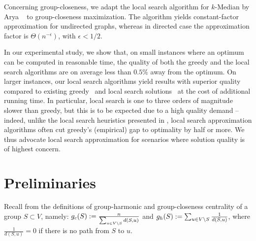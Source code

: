Concerning group-closeness, we adapt the local search algorithm for $k$-Median
by Arya \etal~\cite{DBLP:journals/siamcomp/AryaGKMMP04} to group-closeness
maximization. The algorithm yields constant-factor approximation for undirected
graphs, whereas in directed case the approximation factor is
$\Theta(n^{-\epsilon})$, with $\epsilon < 1/2$.

In our experimental study, we show that, on small instances where an optimum can
be computed in reasonable time, the quality of both the greedy and the local
search algorithms are on average less than $0.5\%$ away from the optimum. On
larger instances, our local search algorithms yield results with superior
quality compared to existing greedy~\cite{DBLP:conf/alenex/BergaminiGM18} and
local search solutions~\cite{DBLP:conf/bigdataconf/AngrimanGM19} at the cost
of additional running time. In particular, local search is one to three orders
of magnitude slower than greedy, but this is to be expected due to a high
quality demand -- indeed, unlike the local search heuristics presented in
, local search approximation algorithms
often cut greedy's (empirical) gap to optimality by half or more. We thus
advocate local search approximation for scenarios where solution quality is of
highest concern.



\section{Preliminaries}
%
Recall from  the definitions of group-harmonic
and group-closeness centrality of a group $S \subset V$, namely:
$g_c(S) := \frac{n}{\sum_{u \in V \setminus S}d(S, u)}$ and
$g_h(S) := \sum_{u \in V \setminus S}\frac{1}{d(S, u)}$, where
$\frac{1}{d(S, u)} = 0$ if there is no
path from $S$ to $u$.

